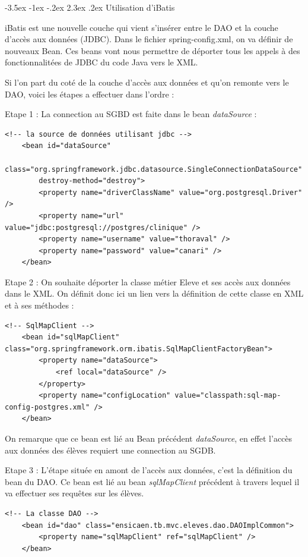 \documentclass[a4paper,12pt]{article}
\makeatletter
\renewcommand\section{\@startsection {section}{1}{\z@}%
                           {-3.5ex \@plus -1ex \@minus -.2ex}%
                           {2.3ex \@plus.2ex}%
                           {\normalfont\Large\bfseries}}
\makeatother
\begin{document}
\section{Utilisation d'iBatis}

iBatis est une nouvelle couche qui vient s'insérer entre le DAO et la couche d'accès aux données (JDBC).
Dans le fichier spring-config.xml, on va définir de nouveaux Bean. Ces beans vont nous permettre de déporter tous les appels à des fonctionnalitées de 
JDBC du code Java vers le XML.

Si l'on part du coté de la couche d'accès aux données et qu'on remonte vers le DAO, voici les étapes a effectuer dans l'ordre :

Etape 1 : La connection au SGBD est faite dans le bean \textit{dataSource} : 

\begin{lstlisting}
<!-- la source de données utilisant jdbc -->
	<bean id="dataSource"
		class="org.springframework.jdbc.datasource.SingleConnectionDataSource"
		destroy-method="destroy">
		<property name="driverClassName" value="org.postgresql.Driver" />
		<property name="url" value="jdbc:postgresql://postgres/clinique" />
		<property name="username" value="thoraval" />
		<property name="password" value="canari" />
	</bean>
\end{lstlisting}

Etape 2 : On souhaite déporter la classe métier Eleve et ses accès aux données dans le XML. On définit donc ici un lien vers la 
définition de cette classe en XML et à ses méthodes :

\begin{lstlisting}
<!-- SqlMapClient -->
	<bean id="sqlMapClient" class="org.springframework.orm.ibatis.SqlMapClientFactoryBean">
		<property name="dataSource">
			<ref local="dataSource" />
		</property>
		<property name="configLocation" value="classpath:sql-map-config-postgres.xml" />
	</bean>
\end{lstlisting}

On remarque que ce bean est lié au Bean précédent \textit{dataSource}, en effet l'accès aux données des élèves requiert une connection au SGDB.

Etape 3 : L'étape située en amont de l'accès aux données, c'est la définition du bean du DAO. Ce bean est lié au bean \textit{sqlMapClient} précédent
à travers lequel il va effectuer ses requêtes sur les élèves.

\begin{lstlisting}
<!-- La classe DAO -->
	<bean id="dao" class="ensicaen.tb.mvc.eleves.dao.DAOImplCommon">
		<property name="sqlMapClient" ref="sqlMapClient" />
	</bean>
\end{lstlisting}
\end{document}
